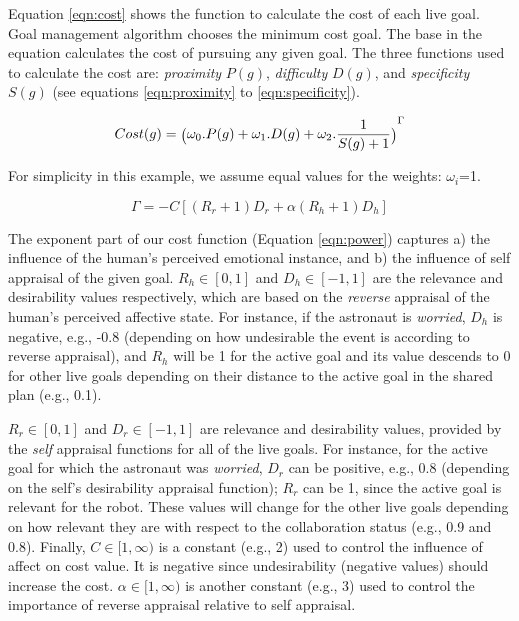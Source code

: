 \documentclass[12pt]{report}
\begin{document}
Equation \ref{eqn:cost} shows the function to calculate the cost of each live
goal. Goal management algorithm chooses the minimum cost goal. The base in the
equation calculates the cost of pursuing any given goal. The three functions
used to calculate the cost are: \textit{proximity} $P(g)$, \textit{difficulty}
$D(g)$, and \textit{specificity} $S(g)$ (see equations \ref{eqn:proximity} to
\ref{eqn:specificity}).

\begin{equation}
{\fontsize{6}{9}\selectfont Cost(g) =
\big(\omega_0.P(g)+\omega_1.D(g)+\omega_2.\frac{1}{S(g)+1}\big)}^{\Gamma}
\label{eqn:cost}
\end{equation}

\noindent For simplicity in this example, we assume equal values for the
weights:
$\omega_i$=1.

\begin{equation}
\Gamma=-C[(R_r+1)D_r + \alpha(R_h+1)D_h]
\label{eqn:power}
\end{equation}

The exponent part of our cost function (Equation \ref{eqn:power}) captures a)
the influence of the human's perceived emotional instance, and b) the influence
of self appraisal of the given goal. $R_h\in[0,1]$ and $D_h\in[-1,1]$ are the
relevance and desirability values respectively, which are based on the
\textit{reverse} appraisal of the human's perceived affective state. For instance, if
the astronaut is \textit{worried}, $D_h$ is negative, e.g., -0.8 (depending on
how undesirable the event is according to reverse appraisal), and $R_h$ will be
1 for the active goal and its value descends to 0 for other live goals depending
on their distance to the active goal in the shared plan (e.g., 0.1).

$R_r\in[0,1]$ and $D_r\in[-1,1]$ are relevance and desirability values, provided
by the \textit{self} appraisal functions for all of the live goals. For
instance, for the active goal for which the astronaut was \textit{worried},
$D_r$ can be positive, e.g., 0.8 (depending on the self's desirability appraisal
function); $R_r$ can be 1, since the active goal is relevant for the robot.
These values will change for the other live goals depending on how
relevant they are with respect to the collaboration status (e.g., 0.9 and 0.8).
Finally, $C\in[1,\infty)$ is a constant (e.g., 2) used to control the influence
of affect on cost value. It is negative since undesirability (negative values)
should increase the cost. $\alpha\in[1,\infty)$ is another constant (e.g., 3)
used to control the importance of reverse appraisal relative to self appraisal.
\end{document}

